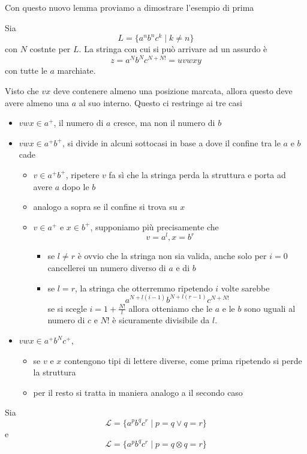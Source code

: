 \documentclass[12pt]{report}
\begin{document}
Con questo nuovo lemma proviamo a dimostrare l'esempio di prima
\begin{tcolorbox}[breakable]
	Sia
	$$ L = \{ a^n b^n c^k \mid k \neq n \} $$
	con $N$ costnte per $L$.
	La stringa con cui si può arrivare ad un assurdo è
	$$ z = a^N b^N c^{N + N!} = uvwxy $$
	con tutte le $a$ marchiate.

	Visto che $vx$ deve contenere almeno una posizione marcata, allora questo deve avere almeno una $a$ al suo interno.
	Questo ci restringe ai tre casi
	\begin{itemize}
		\item $vwx \in a^+$, il numero di $a$ cresce, ma non il numero di $b$
		\item $vwx \in a^+ b^+$, si divide in alcuni sottocasi in base a dove il confine tra le $a$ e $b$ cade
			\begin{itemize}
				\item $v \in a^+ b^+$, ripetere $v$ fa sì che la stringa perda la struttura e porta ad avere $a$ dopo le $b$
				\item analogo a sopra se il confine si trova su $x$
				\item $v \in a^+$ e $x \in b^+$, supponiamo più precisamente che
					$$ v = a^l, x = b^r $$
					\begin{itemize}
						\item se $l \neq r$ è ovvio che la stringa non sia valida, anche solo per $i = 0$ cancellerei un numero diverso di $a$ e di $b$
						\item se $l = r$, la stringa che otterremmo ripetendo $i$ volte sarebbe
							$$ a^{N + l(i - 1)} b^{N + l(r - 1)} c^{N + N!} $$
							se si scegle $i = 1 + \frac{N!}{l}$ allora otteniamo che le $a$ e le $b$ sono uguali al numero di $c$ e $N!$ è sicuramente divisibile da $l$.
					\end{itemize}
			\end{itemize}
		\item $vwx \in a^+ b^N c^+ $, 
			\begin{itemize}
				\item se $v$ e $x$ contengono tipi di lettere diverse, come prima ripetendo si perde la struttura
				\item per il resto si tratta in maniera analogo a il secondo caso
			\end{itemize}
	\end{itemize}
\end{tcolorbox}

\begin{tcolorbox}[breakable]
	Sia
	$$ \mathcal{L} = \{ a^p b^q c^r \mid p = q \vee q = r \} $$
	e 
	$$ \mathcal{L} = \{ a^p b^q c^r \mid p = q \otimes q = r \} $$
\end{tcolorbox}


 
\end{document}
